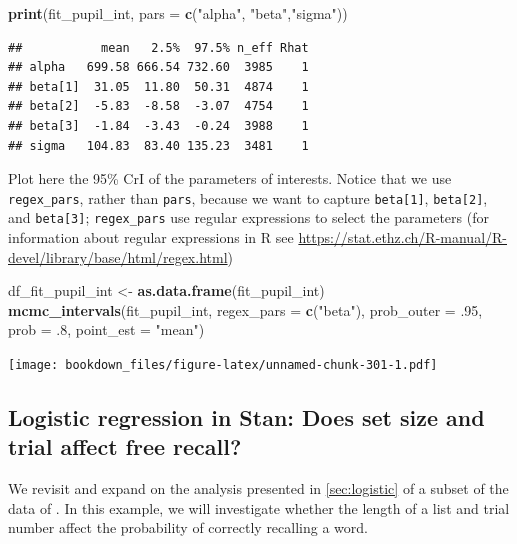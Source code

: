 \documentclass[12pt,]{krantz}
\newenvironment{Shaded}{\begin{snugshade}}{\end{snugshade}}
\newcommand{\DataTypeTok}[1]{\textcolor[rgb]{0.13,0.29,0.53}{#1}}
\newcommand{\FloatTok}[1]{\textcolor[rgb]{0.00,0.00,0.81}{#1}}
\newcommand{\KeywordTok}[1]{\textcolor[rgb]{0.13,0.29,0.53}{\textbf{#1}}}
\newcommand{\NormalTok}[1]{#1}
\newcommand{\StringTok}[1]{\textcolor[rgb]{0.31,0.60,0.02}{#1}}
\theoremstyle{definition}
\theoremstyle{definition}
\theoremstyle{definition}
\theoremstyle{remark}
\begin{document}
\begin{Shaded}
\begin{Highlighting}[]
\KeywordTok{print}\NormalTok{(fit_pupil_int, }\DataTypeTok{pars =} \KeywordTok{c}\NormalTok{(}\StringTok{"alpha"}\NormalTok{, }\StringTok{"beta"}\NormalTok{,}\StringTok{"sigma"}\NormalTok{))}
\end{Highlighting}
\end{Shaded}

\begin{verbatim}
##           mean   2.5%  97.5% n_eff Rhat
## alpha   699.58 666.54 732.60  3985    1
## beta[1]  31.05  11.80  50.31  4874    1
## beta[2]  -5.83  -8.58  -3.07  4754    1
## beta[3]  -1.84  -3.43  -0.24  3988    1
## sigma   104.83  83.40 135.23  3481    1
\end{verbatim}

Plot here the 95\% CrI of the parameters of interests. Notice that we use \texttt{regex\_pars}, rather than \texttt{pars}, because we want to capture \texttt{beta{[}1{]}}, \texttt{beta{[}2{]}}, and \texttt{beta{[}3{]}}; \texttt{regex\_pars} use regular expressions to select the parameters (for information about regular expressions in R see \url{https://stat.ethz.ch/R-manual/R-devel/library/base/html/regex.html})

\begin{Shaded}
\begin{Highlighting}[]
\NormalTok{df_fit_pupil_int <-}\StringTok{ }\KeywordTok{as.data.frame}\NormalTok{(fit_pupil_int)}
\KeywordTok{mcmc_intervals}\NormalTok{(fit_pupil_int,}
               \DataTypeTok{regex_pars =}  \KeywordTok{c}\NormalTok{(}\StringTok{"beta"}\NormalTok{),}
               \DataTypeTok{prob_outer =} \FloatTok{.95}\NormalTok{,}
               \DataTypeTok{prob =} \FloatTok{.8}\NormalTok{,}
               \DataTypeTok{point_est =} \StringTok{"mean"}\NormalTok{)}
\end{Highlighting}
\end{Shaded}

\texttt{[image: bookdown\_files/figure-latex/unnamed-chunk-301-1.pdf]}

\hypertarget{sec:logisticstan}{%
\subsection{Logistic regression in Stan: Does set size and trial affect free recall?}\label{sec:logisticstan}}

We revisit and expand on the analysis presented in \ref{sec:logistic} of a subset of the data of \citet{oberauerWorkingMemoryCapacity2019}. In this example, we will investigate whether the length of a list and trial number affect the probability of correctly recalling a word.
\end{document}
